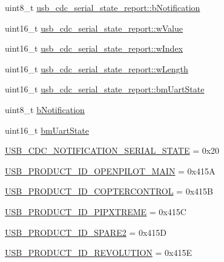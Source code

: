 \begin{DoxyCompactItemize}
\item 
uint8\-\_\-t \hyperlink{group___p_i_o_s___u_s_b___d_e_f_s_ga6d3890d58ae8ae0300f94f680f8ca090}{usb\-\_\-cdc\-\_\-serial\-\_\-state\-\_\-report\-::b\-Notification}
\item 
uint16\-\_\-t \hyperlink{group___p_i_o_s___u_s_b___d_e_f_s_ga6049498eadec3759d00a4063f911a58e}{usb\-\_\-cdc\-\_\-serial\-\_\-state\-\_\-report\-::w\-Value}
\item 
uint16\-\_\-t \hyperlink{group___p_i_o_s___u_s_b___d_e_f_s_ga4246e449725cf89b5d38be3b9396a3ca}{usb\-\_\-cdc\-\_\-serial\-\_\-state\-\_\-report\-::w\-Index}
\item 
uint16\-\_\-t \hyperlink{group___p_i_o_s___u_s_b___d_e_f_s_gaae61f52ac5f36605dd23f8a082ae609a}{usb\-\_\-cdc\-\_\-serial\-\_\-state\-\_\-report\-::w\-Length}
\item 
uint16\-\_\-t \hyperlink{group___p_i_o_s___u_s_b___d_e_f_s_gad0e5711c1eafe5a6c8eeeed328cd58e5}{usb\-\_\-cdc\-\_\-serial\-\_\-state\-\_\-report\-::bm\-Uart\-State}
\item 
uint8\-\_\-t \hyperlink{group___p_i_o_s___u_s_b___d_e_f_s_gaad103f9662f9e0805f460ca3ce27c5bb}{b\-Notification}
\item 
uint16\-\_\-t \hyperlink{group___p_i_o_s___u_s_b___d_e_f_s_ga74589c60371f7e3893ef4e303a6ce2bc}{bm\-Uart\-State}
\item 
\hyperlink{group___p_i_o_s___u_s_b___d_e_f_s_gaf403cb181cb362069801308d723a0b53}{\-U\-S\-B\-\_\-\-C\-D\-C\-\_\-\-N\-O\-T\-I\-F\-I\-C\-A\-T\-I\-O\-N\-\_\-\-S\-E\-R\-I\-A\-L\-\_\-\-S\-T\-A\-T\-E} = 0x20
\item 
\hyperlink{group___p_i_o_s___u_s_b___d_e_f_s_gaf58de49e9aa6af1bd57862ef24b3f327}{\-U\-S\-B\-\_\-\-P\-R\-O\-D\-U\-C\-T\-\_\-\-I\-D\-\_\-\-O\-P\-E\-N\-P\-I\-L\-O\-T\-\_\-\-M\-A\-I\-N} = 0x415\-A
\item 
\hyperlink{group___p_i_o_s___u_s_b___d_e_f_s_ga5d389e4e4c3574fc6903cc6b27621c45}{\-U\-S\-B\-\_\-\-P\-R\-O\-D\-U\-C\-T\-\_\-\-I\-D\-\_\-\-C\-O\-P\-T\-E\-R\-C\-O\-N\-T\-R\-O\-L} = 0x415\-B
\item 
\hyperlink{group___p_i_o_s___u_s_b___d_e_f_s_ga3417d6241159fcb15428fc02a100caf9}{\-U\-S\-B\-\_\-\-P\-R\-O\-D\-U\-C\-T\-\_\-\-I\-D\-\_\-\-P\-I\-P\-X\-T\-R\-E\-M\-E} = 0x415\-C
\item 
\hyperlink{group___p_i_o_s___u_s_b___d_e_f_s_gacf4bcf402cb1c8ae5d1e953bd62acb3d}{\-U\-S\-B\-\_\-\-P\-R\-O\-D\-U\-C\-T\-\_\-\-I\-D\-\_\-\-S\-P\-A\-R\-E2} = 0x415\-D
\item 
\hyperlink{group___p_i_o_s___u_s_b___d_e_f_s_gaa07282bc8e711d5631b861a8afe6014f}{\-U\-S\-B\-\_\-\-P\-R\-O\-D\-U\-C\-T\-\_\-\-I\-D\-\_\-\-R\-E\-V\-O\-L\-U\-T\-I\-O\-N} = 0x415\-E

\end{DoxyCompactItemize}
